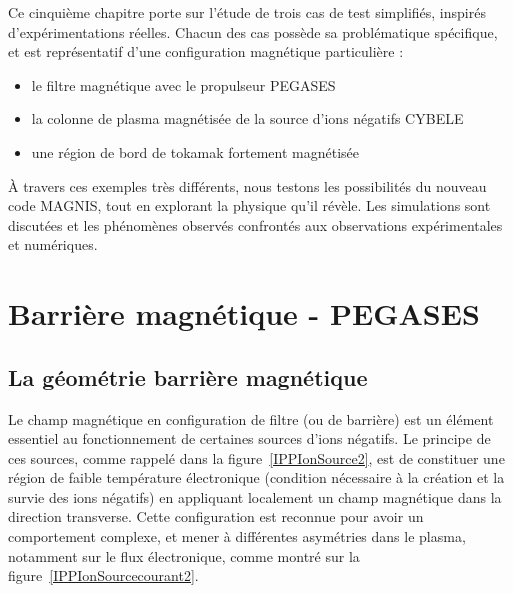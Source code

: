\label{EtudePlasmaMag}
\begin{refsection}
Ce cinquième chapitre porte sur l'étude de trois cas de test simplifiés,
inspirés d'expérimentations réelles. Chacun des cas possède sa problématique
spécifique, et est représentatif d'une configuration magnétique
particulière :

\begin{itemize}
  \item le filtre magnétique avec le propulseur PEGASES
  \item la colonne de plasma magnétisée de la source d'ions négatifs CYBELE
  \item une région de bord de tokamak fortement magnétisée
\end{itemize}

À travers ces exemples très différents, nous testons les possibilités du nouveau
code MAGNIS, tout en explorant la physique qu'il révèle. Les simulations sont discutées et
les phénomènes observés confrontés aux observations expérimentales et
numériques.

\section{Barrière magnétique - PEGASES}
\subsection{La géométrie barrière magnétique}
Le champ magnétique en configuration de filtre (ou de barrière)
est un élément essentiel au fonctionnement de certaines sources d'ions
négatifs. Le principe de ces sources, comme rappelé dans la
figure~\ref{IPPIonSource2}, est de constituer une région de faible température
électronique (condition nécessaire à la création
et la survie des ions négatifs) en appliquant localement un champ magnétique
dans la direction transverse. Cette configuration est reconnue pour avoir un
comportement complexe, et mener à différentes asymétries dans le plasma,
notamment sur le flux électronique, comme montré sur la
figure~\ref{IPPIonSourcecourant2}.


\end{refsection}
